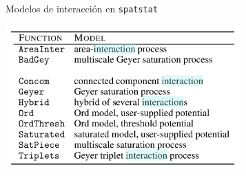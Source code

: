 \documentclass[
  11pt,
  ignorenonframetext,
]{beamer}
\begin{document}
\begin{frame}{Modelos de interacción en \texttt{spatstat}}
\protect\hypertarget{modelos-de-interacciuxf3n-en-spatstat}{}
\begin{center}\includegraphics[width=3.55in]{Figuras/Tabla-tipos-interacciones} \end{center}
\end{frame}
\end{document}
